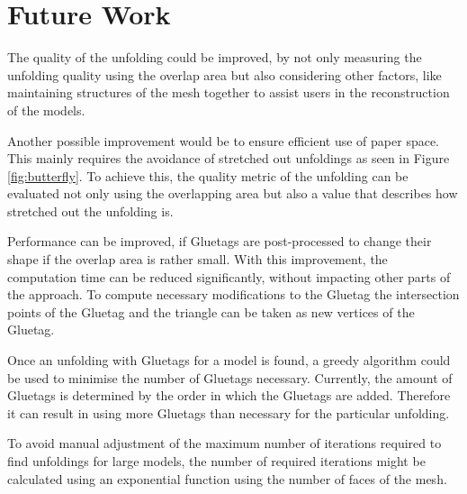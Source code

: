 \documentclass[draft,final]{vutinfth} %
\begin{document}
\section{Future Work}
The quality of the unfolding could be improved, by not only measuring the unfolding quality using the overlap area but also considering other factors, like maintaining structures of the mesh together to assist users in the reconstruction of the models.

Another possible improvement would be to ensure efficient use of paper space. This mainly requires the avoidance of stretched out unfoldings as seen in Figure \ref{fig:butterfly}. To achieve this, the quality metric of the unfolding can be evaluated not only using the overlapping area but also a value that describes how stretched out the unfolding is.

Performance can be improved, if Gluetags are post-processed to change their shape if the overlap area is rather small. With this improvement, the computation time can be reduced significantly, without impacting other parts of the approach. To compute necessary modifications to the Gluetag the intersection points of the Gluetag and the triangle can be taken as new vertices of the Gluetag.

Once an unfolding with Gluetags for a model is found, a greedy algorithm could be used to minimise the number of Gluetags necessary. Currently, the amount of Gluetags is determined by the order in which the Gluetags are added. Therefore it can result in using more Gluetags than necessary for the particular unfolding.

To avoid manual adjustment of the maximum number of iterations required to find unfoldings for large models, the number of required iterations might be calculated using an exponential function using the number of faces of the mesh.
\backmatter

\listoffigures %

\cleardoublepage %
\listoftables %

\listofalgorithms
{}

\printindex

\printglossaries



\end{document}

